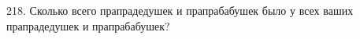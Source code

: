 218. Сколько всего прапрадедушек и прапрабабушек было у всех ваших прапрадедушек и прапрабабушек?\\

